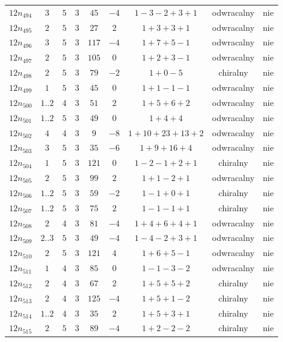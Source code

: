\begin{longtable}{ccccccccc}
$12n_{494}$ & $3$ & $5$ & $3$ & $45$ & $-4$ & $1-3-2+3+1$ & odwracalny & nie \\
$12n_{495}$ & $2$ & $5$ & $3$ & $27$ & $2$ & $1+3+3+1$ & odwracalny & nie \\
$12n_{496}$ & $3$ & $5$ & $3$ & $117$ & $-4$ & $1+7+5-1$ & odwracalny & nie \\
$12n_{497}$ & $2$ & $5$ & $3$ & $105$ & $0$ & $1+2+3-1$ & odwracalny & nie \\
$12n_{498}$ & $2$ & $5$ & $3$ & $79$ & $-2$ & $1+0-5$ & chiralny & nie \\
$12n_{499}$ & $1$ & $5$ & $3$ & $45$ & $0$ & $1+1-1-1$ & odwracalny & nie \\
$12n_{500}$ & $1..2$ & $4$ & $3$ & $51$ & $2$ & $1+5+6+2$ & odwracalny & nie \\
$12n_{501}$ & $1..2$ & $5$ & $3$ & $49$ & $0$ & $1+4+4$ & odwracalny & nie \\
$12n_{502}$ & $4$ & $4$ & $3$ & $9$ & $-8$ & $1+10+23+13+2$ & odwracalny & nie \\
$12n_{503}$ & $3$ & $5$ & $3$ & $35$ & $-6$ & $1+9+16+4$ & odwracalny & nie \\
$12n_{504}$ & $1$ & $5$ & $3$ & $121$ & $0$ & $1-2-1+2+1$ & chiralny & nie \\
$12n_{505}$ & $2$ & $5$ & $3$ & $99$ & $2$ & $1+1-2+1$ & odwracalny & nie \\
$12n_{506}$ & $1..2$ & $5$ & $3$ & $59$ & $-2$ & $1-1+0+1$ & chiralny & nie \\
$12n_{507}$ & $1..2$ & $5$ & $3$ & $75$ & $2$ & $1-1-1+1$ & chiralny & nie \\
$12n_{508}$ & $2$ & $4$ & $3$ & $81$ & $-4$ & $1+4+6+4+1$ & odwracalny & nie \\
$12n_{509}$ & $2..3$ & $5$ & $3$ & $49$ & $-4$ & $1-4-2+3+1$ & odwracalny & nie \\
$12n_{510}$ & $2$ & $5$ & $3$ & $121$ & $4$ & $1+6+5-1$ & odwracalny & nie \\
$12n_{511}$ & $1$ & $4$ & $3$ & $85$ & $0$ & $1-1-3-2$ & odwracalny & nie \\
$12n_{512}$ & $2$ & $4$ & $3$ & $67$ & $2$ & $1+5+5+2$ & chiralny & nie \\
$12n_{513}$ & $2$ & $4$ & $3$ & $125$ & $-4$ & $1+5+1-2$ & chiralny & nie \\
$12n_{514}$ & $1..2$ & $4$ & $3$ & $35$ & $2$ & $1+5+3+1$ & chiralny & nie \\
$12n_{515}$ & $2$ & $5$ & $3$ & $89$ & $-4$ & $1+2-2-2$ & chiralny & nie \\

\end{longtable}
